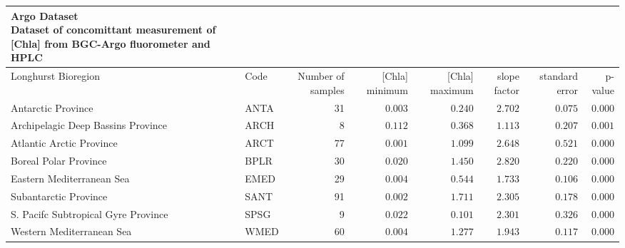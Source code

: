 \captionsetup[table]{labelformat=empty,skip=1pt}
\begin{longtable}{llrrrrrr}
\caption*{
{\large Argo Dataset} \\ 
{\small Dataset of concomittant measurement of [Chla] from BGC-Argo fluorometer and HPLC}
} \\ 
\toprule
Longhurst Bioregion & Code & Number of samples & [Chla] minimum & [Chla] maximum & slope factor & standard error & p-value \\ 
\midrule
Antarctic Province & ANTA & 31 & $0.003$ & $0.240$ & $2.702$ & $0.075$ & $0.000$ \\ 
Archipelagic Deep Bassins Province & ARCH & 8 & $0.112$ & $0.368$ & $1.113$ & $0.207$ & $0.001$ \\ 
Atlantic Arctic Province & ARCT & 77 & $0.001$ & $1.099$ & $2.648$ & $0.521$ & $0.000$ \\ 
Boreal Polar Province & BPLR & 30 & $0.020$ & $1.450$ & $2.820$ & $0.220$ & $0.000$ \\ 
Eastern Mediterranean Sea & EMED & 29 & $0.004$ & $0.544$ & $1.733$ & $0.106$ & $0.000$ \\ 
Subantarctic Province & SANT & 91 & $0.002$ & $1.711$ & $2.305$ & $0.178$ & $0.000$ \\ 
S. Pacifc Subtropical Gyre Province & SPSG & 9 & $0.022$ & $0.101$ & $2.301$ & $0.326$ & $0.000$ \\ 
Western Mediterranean Sea & WMED & 60 & $0.004$ & $1.277$ & $1.943$ & $0.117$ & $0.000$ \\ 
 \bottomrule
\end{longtable}

